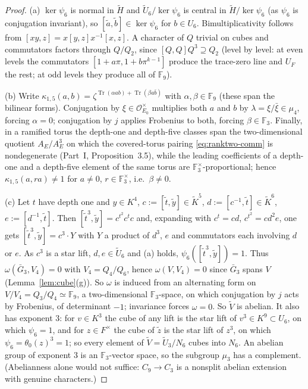 \documentclass[11pt]{article}
\newcommand{\Fq}{\mathbb F}
\newcommand{\Tr}{\operatorname{Tr}}
\newcommand{\tH}{\widetilde H}
\newcommand{\tU}{\widetilde U}
\newcommand{\tV}{\widetilde V}
\newcommand{\Ocal}{\mathcal O}
\theoremstyle{plain}
\theoremstyle{definition}
\begin{document}
\begin{proof}
(a) $\ker\psi_6$ is normal in $\tH$ and $\tU_6/\ker\psi_6$ is central
in $\tH/\ker\psi_6$ (as $\psi_6$ is conjugation invariant), so
$[\tilde a,\tilde b]\in\ker\psi_6$ for $b\in U_6$.  Bimultiplicativity
follows from $[xy,z]=x[y,z]x^{-1}[x,z]$.  A character of $Q$ trivial on
cubes and commutators factors through $Q/Q_2$, since
$[Q,Q]Q^3\supseteq Q_2$ (level by level: at even levels the commutators
$[1+a\pi,1+b\pi^{k-1}]$ produce the trace-zero line and $U_F$ the rest;
at odd levels they produce all of $\Fq_9$).

(b) Write $\kappa_{1,5}(a,b)=\zeta^{\Tr(\alpha ab)+\Tr(\beta a\bar b)}$ with
$\alpha,\beta\in\Fq_9$ (these span the bilinear forms).  Conjugation
by $\xi\in\Ocal_{E_0}^\times$ multiplies both $a$ and $b$ by
$\lambda=\xi/\bar\xi\in\mu_4$, forcing $\alpha=0$; conjugation by $j$
applies Frobenius to both, forcing $\beta\in\Fq_3$.  Finally, in a
ramified torus the depth-one and depth-five classes span the
two-dimensional quotient $A_E/A_E^3$ on which the covered-torus pairing
\eqref{eq:ranktwo-comm} is nondegenerate (Part~I, Proposition~3.5),
while the leading coefficients of a depth-one and a depth-five element
of the same torus are $\Fq_3^\times$-proportional; hence
$\kappa_{1,5}(a,ra)\ne1$ for $a\ne0$, $r\in\Fq_3^\times$, i.e.\ $\beta\ne0$.

(c) Let $t$ have depth one and $y\in K^4$, $c:=[\tilde t,\tilde y]\in\tilde K^5$,
$d:=[c^{-1},\tilde t]\in\tilde K^6$, $e:=[d^{-1},\tilde t]$.  Then
$[\tilde t^3,\tilde y]=c^{t^2}c^{t}c$ and, expanding with $c^t=cd$,
$c^{t^2}=cd^2e$, one gets $[\tilde t^3,\tilde y]=c^3\cdot Y$ with $Y$ a
product of $d^3$, $e$ and commutators each involving $d$ or $e$.  As
$c^3$ is a star lift, $d,e\in\tU_6$ and (a) holds, $\psi_6([\tilde t^3,\tilde y])=1$.
Thus $\omega(\bar G_3,V_4)=0$ with $V_4=Q_4/Q_6$, hence $\omega(V,V_4)=0$
since $\bar G_3$ spans $V$ (Lemma~\ref{lem:cube}(g)).  So $\omega$ is
induced from an alternating form on $V/V_4=Q_3/Q_4\simeq\Fq_9$, a
two-dimensional $\Fq_3$-space, on which conjugation by $j$ acts by
Frobenius, of determinant $-1$; invariance forces $\omega=0$.  So $\tV$
is abelian.  It also has exponent $3$: for $v\in K^3$ the cube of any
lift is the star lift of $v^3\in K^9\subset U_6$, on which $\psi_6=1$,
and for $z\in F^\times$ the cube of $\tilde z$ is the star lift of
$z^3$, on which $\psi_6=\theta_0(z)^3=1$; so every element of
$\tV=\tU_3/N_6$ cubes into $N_6$.  An abelian group of exponent $3$ is
an $\Fq_3$-vector space, so the subgroup $\mu_3$ has a complement.
(Abelianness alone would not suffice: $C_9\to C_3$ is a nonsplit abelian
extension with genuine characters.)


\end{proof}
\end{document}

